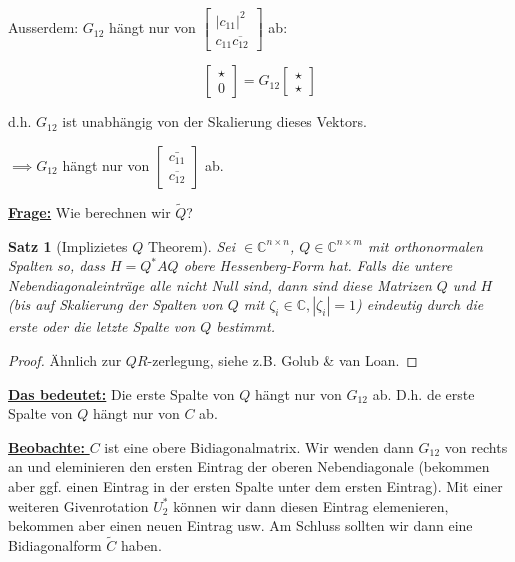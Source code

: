 \documentclass{book}
\newtheorem{theorem}[algorithm]{Satz}
\def\C{\mathbb{C}}
\begin{document}
            Ausserdem: $G_{12}$ hängt nur von $\begin{bmatrix}
                |c_{11}|^2\\
                c_{11}\overline{c_{12}}
            \end{bmatrix}$ ab:

            \begin{equation*}
                \begin{bmatrix}
                    \star \\
                    0
                \end{bmatrix}=G_{12}\begin{bmatrix}
                    \star \\ \star
                \end{bmatrix}
            \end{equation*}

            d.h. $G_{12}$ ist unabhängig von der Skalierung dieses Vektors. 

            $\implies G_{12}$ hängt nur von $\begin{bmatrix}
                \bar{c_{11}}\\
                \overline{c_{12}}
            \end{bmatrix}$
            ab.

            \underline{\textbf{Frage:}} Wie berechnen wir $\tilde{Q}$?

            \begin{theorem}[Implizietes $Q$ Theorem]\label{s4.29}
                Sei $\in\C^{n\times n}$, $Q\in\C^{n\times m}$ mit orthonormalen Spalten so, dass $H=Q^*AQ$
                obere Hessenberg-Form hat. Falls die untere Nebendiagonaleinträge alle nicht Null sind, dann sind diese Matrizen $Q$ und $H$
                (bis auf Skalierung der Spalten von $Q$ mit $\zeta_i\in\C,|\zeta_i|=1$) eindeutig durch die erste oder die letzte Spalte von $Q$ bestimmt.
            \end{theorem}

            \begin{proof}
                Ähnlich zur $QR$-zerlegung, siehe z.B. Golub \& van Loan.
            \end{proof}

            \underline{\textbf{Das bedeutet:}} Die erste Spalte von $Q$ hängt nur von $G_{12}$ ab. D.h. de erste Spalte von $Q$ hängt nur von $C$ ab.

            \underline{\textbf{Beobachte: }} $C$ ist eine obere Bidiagonalmatrix. Wir wenden dann $G_{12}$ von rechts an und eleminieren den ersten Eintrag der oberen Nebendiagonale (bekommen aber ggf. einen Eintrag in der ersten Spalte unter dem ersten Eintrag).
            Mit einer weiteren Givenrotation $U_2^*$ können wir dann diesen Eintrag elemenieren, bekommen aber einen neuen Eintrag usw. Am Schluss sollten wir dann eine Bidiagonalform $\tilde{C}$ haben.
\end{document}
